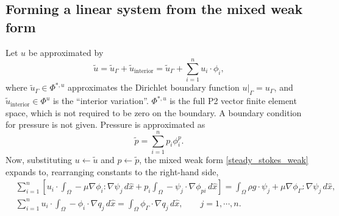 
\subsection{Forming a linear system from the mixed weak form}
Let $u$ be approximated by
    $$\tilde{u} = \tilde{u}_\Gamma + \tilde{u}_\text{interior} = \tilde{u}_\Gamma + \sum_{i=1}^n u_i\cdot \phi_i,$$
where $\tilde{u}_\Gamma \in \Phi^{*,u}$ approximates the Dirichlet boundary function $\left.u\right|_\Gamma = u_\Gamma$,
and $\tilde{u}_{\text{interior}} \in \Phi^u$ is the ``interior variation''.
$\Phi^{*,u}$ is the full P2 vector finite element space, which is not required to be zero on the boundary.
A boundary condition for pressure is not given. Pressure is approximated as
    $$\tilde{p} = \sum_{i=1}^n p_i\phi^p_i.$$
Now, substituting $u \leftarrow \tilde{u}$ and $p \leftarrow \tilde{p}$, the mixed weak form \eqref{steady_stokes_weak} expands to,
rearranging constants to the right-hand side,
\begin{equation}\label{steady_stokes_linear_system}
\begin{split}
&\sum_{i=1}^n \left[u_i\cdot \int_\Omega -\mu\nabla\phi_i : \nabla\psi_j\,d\hat{x}
        + p_i\int_{\Omega} -\psi_j \cdot \nabla\phi_{pi}\,d\hat{x}\right]
    = \int_\Omega \rho g\cdot\psi_j
        + \mu\nabla\phi_\Gamma :\nabla\psi_j \,d\hat{x},\\
&\sum_{i=1}^n u_i \cdot \int_\Omega -\phi_i \cdot \nabla q_j \,d\hat{x}
    = \int_\Omega \phi_\Gamma \cdot \nabla q_j \,d\hat{x},
\quad\quad j=1,\cdots,n.
\end{split}
\end{equation}

